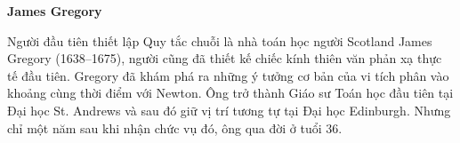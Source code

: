 \noindent
\begin{minipage}[t]{0.26\textwidth}
    \vspace*{11.9cm}
    \begin{historybox}
        {\fontsize{9pt}{11pt}\selectfont\textbf{\textsf{\color{stewartgreen}James Gregory}}\par}\vspace{3pt}
        {\fontsize{7.5pt}{9.5pt}\selectfont
        Người đầu tiên thiết lập Quy tắc chuỗi là nhà toán học người Scotland James Gregory (1638--1675), người cũng đã thiết kế chiếc kính thiên văn phản xạ thực tế đầu tiên. Gregory đã khám phá ra những ý tưởng cơ bản của vi tích phân vào khoảng cùng thời điểm với Newton. Ông trở thành Giáo sư Toán học đầu tiên tại Đại học St. Andrews và sau đó giữ vị trí tương tự tại Đại học Edinburgh. Nhưng chỉ một năm sau khi nhận chức vụ đó, ông qua đời ở tuổi 36.\par}
    \end{historybox}
\end{minipage}%
\hfill
